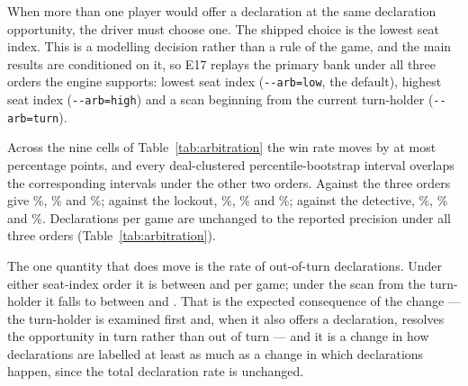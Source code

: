 When more than one player would offer a declaration at the same declaration
opportunity, the driver must choose one. The shipped choice is the lowest seat
index. This is a modelling decision rather than a rule of the game, and the
main results are conditioned on it, so E17 replays the primary bank under all
three orders the engine supports: lowest seat index (\texttt{-{}-arb=low}, the
default), highest seat index (\texttt{-{}-arb=high}) and a scan beginning from
the current turn-holder (\texttt{-{}-arb=turn}).

\begin{table}[ht]
\centering
\caption{E17: sensitivity of the primary head-to-head results to the order in
which simultaneous voluntary declarations are arbitrated. The frozen \vfast{}
configuration (\texttt{v04:mgate=0.008}, no refitting) replayed against three
opponents under three arbitration orders; \numEseventeenDeals{} deals played in
six seat rotations, \numHtHGames{} games per cell, seed 90210, full dialect.
``Win rate'' is \vfast{}'s share of games won; intervals are deal-clustered
percentile bootstrap, the 2.5\% and 97.5\% percentiles of \numBootstrapDraws{}
resamples of deals. The last column is \vfast{}'s out-of-turn declarations per
game. The lowest-seat rows are the shipped configuration and coincide with
Table~\ref{tab:h2h}.}
\label{tab:arbitration}
\small

\end{table}

Across the nine cells of Table~\ref{tab:arbitration} the win rate moves by at
most \numArbMaxMove{} percentage points, and every deal-clustered
percentile-bootstrap interval overlaps the corresponding intervals under the
other two orders. Against \vthree{} the three orders give \numVsVthree\%,
\numArbHighVthree\% and \numArbTurnVthree\%; against the lockout,
\numVsLockout\%, \numArbHighLockout\% and \numArbTurnLockout\%; against the
detective, \numVsDetective\%, \numArbHighDetective\% and
\numArbTurnDetective\%. Declarations per game are unchanged to the reported
precision under all three orders (Table~\ref{tab:arbitration}).

The one quantity that does move is the rate of out-of-turn declarations. Under
either seat-index order it is between \numArbOOTSeatLo{} and
\numArbOOTSeatHi{} per game; under the scan from the turn-holder it falls to
between \numArbOOTTurnLo{} and \numArbOOTTurnHi{}. That is the expected
consequence of the change --- the turn-holder is examined first and, when it
also offers a declaration, resolves the opportunity in turn rather than out of
turn --- and it is a change in how declarations are labelled at least as much as
a change in which declarations happen, since the total declaration rate is
unchanged.

